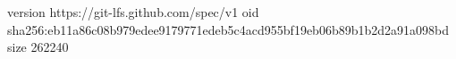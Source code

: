 version https://git-lfs.github.com/spec/v1
oid sha256:eb11a86c08b979edee9179771edeb5c4acd955bf19eb06b89b1b2d2a91a098bd
size 262240
